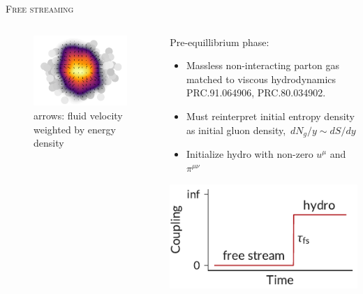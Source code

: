 \documentclass[aspectratio=169]{beamer}
\begin{document}
\begin{frame}[t]{\scshape Free streaming}
  \begin{columns}[T]
    \begin{column}{.5\textwidth}
      \begin{figure}
        \includegraphics[width=\textwidth]{trento_freestream}\\
        \small arrows: fluid velocity\\weighted by energy density
      \end{figure}
    \end{column}
    \begin{column}{.5\textwidth}
      \bigskip \centering
      \textcolor{theme}{Pre-equillibrium phase:}
      \begin{itemize}
        \small
        \item Massless non-interacting parton gas matched to viscous hydrodynamics
          \textcolor{theme}{\scriptsize PRC.91.064906, PRC.80.034902}.
        \item Must reinterpret initial entropy density as initial gluon density,\,
          $dN_g/y \sim dS/dy$
        \item Initialize hydro with non-zero $u^\mu$ and $\pi^{\mu\nu}$
      \end{itemize}
      \medskip
      \includegraphics{coupling}
    \end{column}
  \end{columns}
\end{frame}
\end{document}
